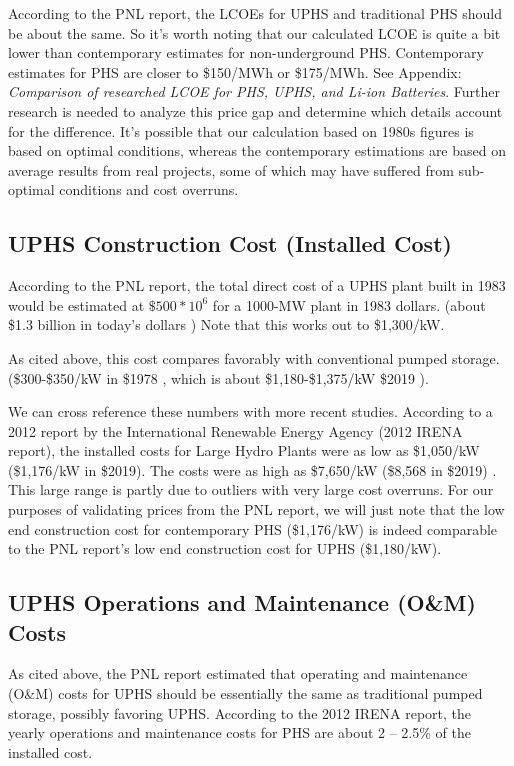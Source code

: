 \documentclass[hidelinks,12pt,a4paper]{article}
\begin{document}
According to the PNL report, the LCOEs for UPHS and traditional PHS should be about the same. So it's worth noting that our calculated LCOE is quite a bit lower than contemporary estimates for non-underground PHS. Contemporary estimates for PHS are closer to \$150/MWh or \$175/MWh. See Appendix: \textit{Comparison of researched LCOE for PHS, UPHS, and Li-ion Batteries}. Further research is needed to analyze this price gap and determine which details account for the difference. It's possible that our calculation based on 1980s figures is based on optimal conditions, whereas the contemporary estimations are based on average results from real projects, some of which may have suffered from sub-optimal conditions and cost overruns.


\subsection{UPHS Construction Cost (Installed Cost)}

According to the PNL report, the total direct cost of a UPHS plant built in 1983 would be estimated at $\$500 * 10^6$ for a 1000-MW plant in 1983 dollars.\cite{UndergroundPumpedHydroelectricStorage} (about \$1.3 billion in today's dollars \cite{CPIInflationCalculator}) Note that this works out to \$1,300/kW.

As cited above, this cost compares favorably with conventional pumped storage. (\$300-\$350/kW in \$1978 \cite{UndergroundPumpedHydroelectricStorage}, which is about \$1,180-\$1,375/kW \$2019 \cite{CPIInflationCalculator}).

We can cross reference these numbers with more recent studies. According to a 2012 report by the International Renewable Energy Agency (2012 IRENA report), the installed costs for Large Hydro Plants were as low as \$1,050/kW (\$1,176/kW in \$2019). The costs were as high as \$7,650/kW (\$8,568 in \$2019) \cite{RenewableEnergyTechnologiesCostAnalysisSeries}. This large range is partly due to outliers with very large cost overruns. For our purposes of validating prices from the PNL report, we will just note that the low end construction cost for contemporary PHS (\$1,176/kW) is indeed comparable to the PNL report's low end construction cost for UPHS (\$1,180/kW).

\subsection{UPHS Operations and Maintenance (O\&M) Costs}
As cited above, the PNL report estimated that operating and maintenance (O\&M) costs for UPHS should be essentially the same as traditional pumped storage, possibly favoring UPHS. \cite{UndergroundPumpedHydroelectricStorage} According to the 2012 IRENA report, the yearly operations and maintenance costs for PHS are about 2 – 2.5\% of the installed cost.
\end{document}
